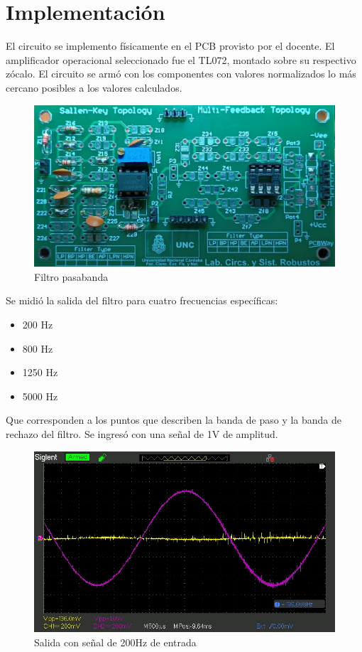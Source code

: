 \section{Implementación}
El circuito se implemento físicamente en el PCB provisto por el docente. El amplificador operacional seleccionado fue el TL072, montado sobre su respectivo zócalo. El circuito se armó con los componentes con valores normalizados lo más cercano posibles a los valores calculados.

\begin{figure}[H]
    \centering
    \includegraphics[width=0.75\linewidth]{Filtro pasabanda.jpg}
    \caption{Filtro pasabanda}
    \label{fig:enter-label}
\end{figure}

Se midió la salida del filtro para cuatro frecuencias específicas:
\begin{itemize}
    \item 200 Hz
    \item 800 Hz
    \item 1250 Hz
    \item 5000 Hz
\end{itemize}

Que corresponden a los puntos que describen la banda de paso y la banda de rechazo del filtro. Se ingresó con una señal de 1V de amplitud.

\begin{figure}[H]
    \centering
    \includegraphics[width=0.75\linewidth]{figuras/SDS00033.jpg}
    \caption{Salida con señal de 200Hz de entrada}
    \label{fig:enter-label}
\end{figure}

